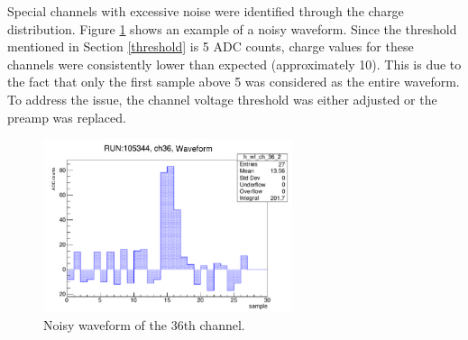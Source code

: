 Special channels with excessive noise were identified 
through the charge distribution. 
Figure \ref{fig:noisywf} shows an example of a noisy waveform. 
Since the threshold mentioned in Section \ref{threshold} 
is 5 ADC counts, charge values for these channels were 
consistently lower than expected (approximately 10). 
This is due to the fact that only the first sample above 
5 was considered as the entire waveform.
To address the issue, the channel voltage threshold was 
either adjusted or the preamp was replaced.
\begin{figure}[!h]
  \centering
  \includegraphics[width=0.65\textwidth]{figures/pdf/noise.pdf}
  \caption[Noisy waveform of the 36th channel.]{Noisy 
  waveform of the 36th channel.}
  \label{fig:noisywf}
\end{figure}

